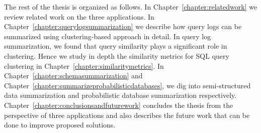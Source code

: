 The rest of the thesis is organized as follows.
In Chapter~\ref{chapter:relatedwork} we review related work on the three applications.
In Chapter~\ref{chapter:querylogsummarization} we describe how query logs can be summarized using clustering-based approach in detail.
In query log summarization, we found that query similarity plays a significant role in clustering.
Hence we study in depth the similarity metrics for SQL query clustering in Chapter~\ref{chapter:similaritymetrics}.
In Chapter~\ref{chapter:schemasummarization} and Chapter~\ref{chapter:summarizeprobabilisticdatabases}, we dig into semi-structured data summarization and probabilistic database summarization respectively.
Chapter~\ref{chapter:conclusionsandfuturework} concludes the thesis from the perspective of three applications and also describes the future work that can be done to improve proposed solutions.